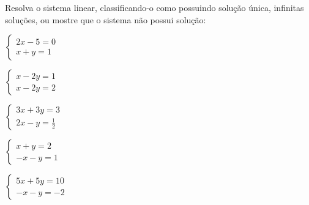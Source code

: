 \begin{secaoexercicio}
\begin{xca} Resolva o sistema linear, classificando-o como possuindo solução única, infinitas soluções,
 ou mostre que o sistema não possui solução:
\begin{colexercicio}{3}
\item
$\left\{\begin{array}{c}
2x-5=0\\
x+y=1
\end{array}\right.$
\item
$\left\{\begin{array}{c}
x-2y=1\\
x-2y=2
\end{array}\right.$
\item
$\left\{\begin{array}{c}
3x+3y=3\\
2x-y=\frac{1}{2}
\end{array}\right.$
\item
$\left\{\begin{array}{c}
x+y=2\\
-x-y=1
\end{array}\right.$
\item
$\left\{\begin{array}{c}
5x+5y=10\\
-x-y=-2
\end{array}\right.$
\end{colexercicio}
\end{xca}
\end{secaoexercicio}
